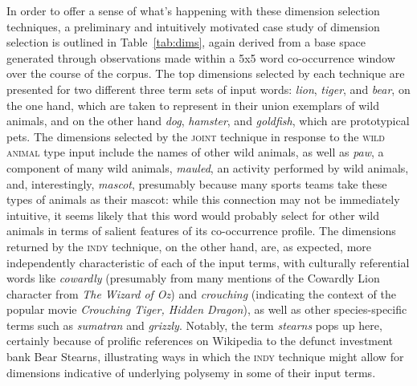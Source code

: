 In order to offer a sense of what's happening with these dimension selection techniques, a preliminary and intuitively motivated case study of dimension selection is outlined in Table~\ref{tab:dims}, again derived from a base space generated through observations made within a 5x5 word co-occurrence window over the course of the corpus.  The top dimensions selected by each technique are presented for two different three term sets of input words: \emph{lion}, \emph{tiger}, and \emph{bear}, on the one hand, which are taken to represent in their union exemplars of wild animals, and on the other hand \emph{dog}, \emph{hamster}, and \emph{goldfish}, which are prototypical pets.  The dimensions selected by the \textsc{joint} technique in response to the \textsc{wild animal} type input include the names of other wild animals, as well as \emph{paw}, a component of many wild animals, \emph{mauled}, an activity performed by wild animals, and, interestingly, \emph{mascot}, presumably because many sports teams take these types of animals as their mascot: while this connection may not be immediately intuitive, it seems likely that this word would probably select for other wild animals in terms of salient features of its co-occurrence profile.  The dimensions returned by the \textsc{indy} technique, on the other hand, are, as expected, more independently characteristic of each of the input terms, with culturally referential words like \emph{cowardly} (presumably from many mentions of the Cowardly Lion character from \emph{The Wizard of Oz}) and \emph{crouching} (indicating the context of the popular movie \emph{Crouching Tiger, Hidden Dragon}), as well as other species-specific terms such as \emph{sumatran} and \emph{grizzly}.  Notably, the term \emph{stearns} pops up here, certainly because of prolific references on Wikipedia to the defunct investment bank Bear Stearns, illustrating ways in which the \textsc{indy} technique might allow for dimensions indicative of underlying polysemy in some of their input terms.

